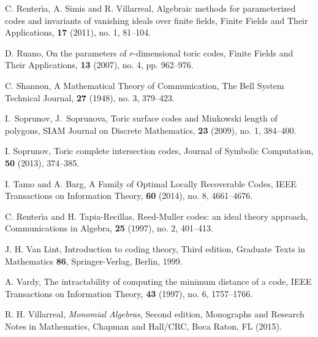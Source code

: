 \documentclass[12pt]{amsart}
\theoremstyle{plain}
\begin{document}
\begin{thebibliography}{99}
 C. Renter\'\i a, A. Simis and R. Villarreal,
Algebraic methods for parameterized codes and invariants of vanishing ideals over finite fields,
Finite Fields and Their Applications, {\bf 17} (2011), no. 1, 81--104.

D. Ruano, 
On the parameters of $r$-dimensional toric codes,
Finite Fields and Their Applications, {\bf 13} (2007), no. 4, pp. 962--976.

 C. Shannon,
A Mathematical Theory of Communication,
The Bell System Technical Journal, {\bf 27} (1948), no. 3, 379--423.

 I.~Soprunov, J.~Soprunova,
Toric surface codes and Minkowski length of polygons,
SIAM Journal on Discrete Mathematics, {\bf 23} (2009), no. 1, 384--400.

 I. Soprunov,
Toric complete intersection codes,
Journal of Symbolic Computation, {\bf 50} (2013), 374--385.

 I. Tamo and A. Barg,
A Family of Optimal Locally Recoverable Codes,
IEEE Transactions on Information Theory, {\bf 60} (2014), no. 8, 4661--4676.

 C. Renter\'\i a and H. Tapia-Recillas, 
Reed-Muller codes: an ideal theory approach,
Communications in Algebra, {\bf 25} (1997), no. 2, 401--413.

 J. H. Van Lint,
Introduction to coding theory,
Third edition, Graduate Texts in Mathematics {\bf 86}, Springer-Verlag, Berlin, 1999.

 A. Vardy,
The intractability of computing the minimum distance of a code,
IEEE Transactions on Information Theory, {\bf 43} (1997), no. 6, 1757--1766.

 R. H. Villarreal, {\it Monomial Algebras\/},
Second edition, 
Monographs and Research Notes in Mathematics, Chapman and Hall/CRC,
Boca Raton, FL (2015).
\end{thebibliography}
\end{document}
